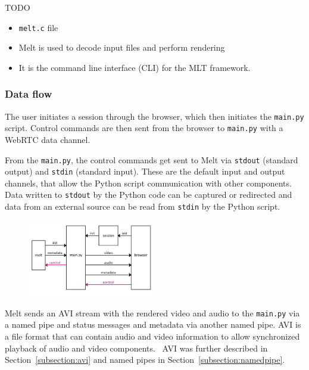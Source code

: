 \documentclass[12pt,a4paper]{article}
\begin{document}
TODO

\begin{itemize}
	\item \texttt{melt.c} file
	\item Melt is used to decode input files and perform rendering
	\item It is the command line interface (CLI) for the MLT framework.
\end{itemize}





\subsubsection{Data flow}

The user initiates a session through the browser, which then initiates the \texttt{main.py} script.
Control commands are then sent from the browser to \texttt{main.py} with a WebRTC data channel.

From the \texttt{main.py}, the control commands get sent to Melt via \texttt{stdout} (standard output) and \texttt{stdin} (standard input). These are the default input and output channels, that allow the Python script communication with other components.
Data written to \texttt{stdout} by the Python code can be captured or redirected and data from an external source can be read from \texttt{stdin} by the Python script. \cite{python}

\begin{figure}[H]
	\centering
	\includegraphics[width=0.5\textwidth]{IM_control.png}
\end{figure}


Melt sends an AVI stream with the rendered video and audio to the \texttt{main.py} via a named pipe and status messages and metadata via another named pipe.
AVI is a file format that can contain audio and video information to allow synchronized playback of audio and video components.~\cite{avi} AVI was further described in Section~\ref{subsection:avi} and named pipes in Section~\ref{subsection:namedpipe}.
\end{document}
